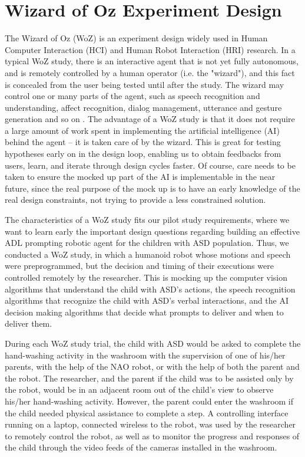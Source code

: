 \section{Wizard of Oz Experiment Design}

The Wizard of Oz (WoZ) is an experiment design widely used in Human Computer Interaction (HCI) and Human Robot Interaction (HRI) research.  In a typical WoZ study, there is an interactive agent that is not yet fully autonomous, and is remotely controlled by a human operator (i.e. the "wizard"), and this fact is concealed from the user being tested until after the study.  The wizard may control one or many parts of the agent, such as speech recognition and understanding, affect recognition, dialog management, utterance and gesture generation and so on \cite{bhargava2013demonstration}.  The advantage of a WoZ study is that it does not require a large amount of work spent in implementing the artificial intelligence (AI) behind the agent -- it is taken care of by the wizard.  This is great for testing hypotheses early on in the design loop, enabling us to obtain feedbacks from users, learn, and iterate through design cycles faster.  Of course, care needs to be taken to ensure the mocked up part of the AI is implementable in the near future, since the real purpose of the mock up is to have an early knowledge of the real design constraints, not trying to provide a less constrained solution.

The characteristics of a WoZ study fits our pilot study requirements, where we want to learn early the important design questions regarding building an effective ADL prompting robotic agent for the children with ASD population.  Thus, we conducted a WoZ study, in which a humanoid robot whose motions and speech were preprogrammed, but the decision and timing of their executions were controlled remotely by the researcher.  This is mocking up the computer vision algorithms that understand the child with ASD's actions, the speech recognition algorithms that recognize the child with ASD's verbal interactions, and the AI decision making algorithms that decide what prompts to deliver and when to deliver them.

During each WoZ study trial, the child with ASD would be asked to complete the hand-washing activity in the washroom with the supervision of one of his/her parents, with the help of the NAO robot, or with the help of both the parent and the robot. The researcher, and the parent if the child was to be assisted only by the robot, would be in an adjacent room out of the child's view to observe his/her hand-washing activity.  However, the parent could enter the washroom if the child needed physical assistance to complete a step. A controlling interface running on a laptop, connected wireless to the robot, was used by the researcher to remotely control the robot, as well as to monitor the progress and responses of the child through the video feeds of the cameras installed in the washroom.


